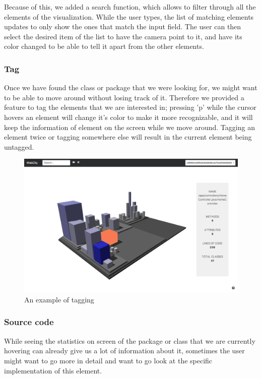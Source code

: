\documentclass[]{usiinfbachelorproject}
\begin{document}
Because of this, we added a search function, which allows to filter through all the elements of the visualization. While the user types,
the list of matching elements updates to only show the ones that match the input field. The user can then select the desired item of the list to have the camera point to it,
and have its color changed to be able to tell it apart from the other elements.

\subsubsection{Tag} \label{Tag}
Once we have found the class or package that we were looking for, we might want to be able to move around without losing track of it. Therefore we provided a feature to tag the elements
that we are interested in; pressing 'p' while the cursor hovers an element will change it's color to make it more recognizable, and it will keep the information of element on the screen
while we move around. Tagging an element twice or tagging somewhere else will result in the current element being untagged.

\begin{figure} [H]
\centering
\includegraphics[width=1\textwidth]{pictures/tag.png}
\caption{An example of tagging}
\label{fig:tag}
\end{figure}

\subsubsection{Source code} \label{Source code}
While seeing the statistics on screen of the package or class that we are currently hovering can already give us a lot of information about it, sometimes the user might want to go more in detail and want to go look at the specific implementation of this element.
\end{document}
